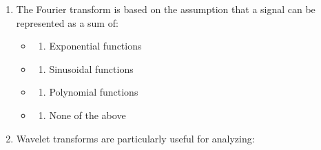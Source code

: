 \documentclass[
  letterpaper,
  DIV=11,
  numbers=noendperiod]{scrartcl}
\providecommand{\tightlist}{%
  \setlength{\itemsep}{0pt}\setlength{\parskip}{0pt}}\usepackage{longtable,booktabs,array}
\begin{document}
\begin{enumerate}
  \begin{itemize}
  \tightlist
  \item
    \begin{enumerate}
    \def\labelenumii{\alph{enumii})}
    \tightlist
    \item
      Image compression
    \end{enumerate}
  \item
    \begin{enumerate}
    \def\labelenumii{\alph{enumii})}
    \setcounter{enumii}{1}
    \tightlist
    \item
      Speech recognition
    \end{enumerate}
  \item
    \begin{enumerate}
    \def\labelenumii{\alph{enumii})}
    \setcounter{enumii}{2}
    \tightlist
    \item
      Seismic data analysis
    \end{enumerate}
  \item
    \begin{enumerate}
    \def\labelenumii{\alph{enumii})}
    \setcounter{enumii}{3}
    \tightlist
    \item
      All of the above
    \end{enumerate}
  \end{itemize}
\item
  The Fourier transform is based on the assumption that a signal can be
  represented as a sum of:

  \begin{itemize}
  \tightlist
  \item
    \begin{enumerate}
    \def\labelenumii{\alph{enumii})}
    \tightlist
    \item
      Exponential functions
    \end{enumerate}
  \item
    \begin{enumerate}
    \def\labelenumii{\alph{enumii})}
    \setcounter{enumii}{1}
    \tightlist
    \item
      Sinusoidal functions
    \end{enumerate}
  \item
    \begin{enumerate}
    \def\labelenumii{\alph{enumii})}
    \setcounter{enumii}{2}
    \tightlist
    \item
      Polynomial functions
    \end{enumerate}
  \item
    \begin{enumerate}
    \def\labelenumii{\alph{enumii})}
    \setcounter{enumii}{3}
    \tightlist
    \item
      None of the above
    \end{enumerate}
  \end{itemize}
\item
  Wavelet transforms are particularly useful for analyzing:


\end{enumerate}
\end{document}

